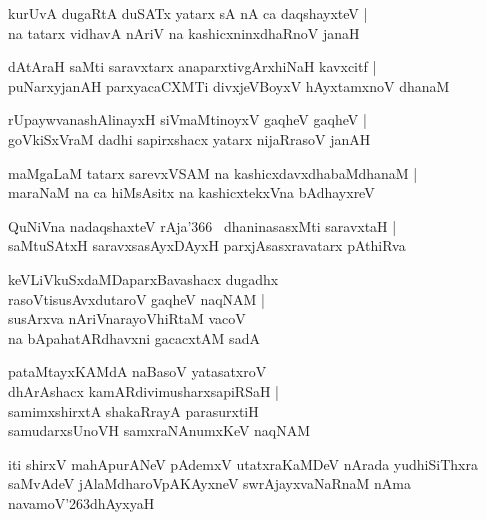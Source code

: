 \documentclass[twoside,12pt,openright]{book}
\def\S{\char'263}
\newcounter{shloka}[chapter]
\begin{document}
\begin{shloka}%
kurUvA dugaRtA duSATx yatarx sA nA ca daqshayxteV |\\
na tatarx vidhavA nAriV na kashicxninxdhaRnoV janaH
\end{shloka}

\begin{shloka}%
dAtAraH saMti saravxtarx anaparxtivgArxhiNaH kavxcitf |\\
puNarxyjanAH parxyacaCXMTi divxjeVBoyxV hAyxtamxnoV dhanaM
\end{shloka}

\begin{shloka}%
rUpaywvanashAlinayxH siVmaMtinoyxV gaqheV gaqheV |\\
goVkiSxVraM dadhi sapirxshacx yatarx nijaRrasoV janAH
\end{shloka}

\begin{shloka}%
maMgaLaM tatarx sarevxVSAM na kashicxdavxdhabaMdhanaM |\\
maraNaM na ca hiMsAsitx na kashicxtekxVna bAdhayxreV 
\end{shloka}

\begin{shloka}%
QuNiVna nadaqshaxteV rAja\char'366 ~dhaninasasxMti saravxtaH |\\
saMtuSAtxH saravxsasAyxDAyxH parxjAsasxravatarx pAthiRva 
\end{shloka}

\begin{shloka}%
keVLiVkuSxdaMDaparxBavashacx dugadhx\\
rasoVtisusAvxdutaroV gaqheV naqNAM |\\
susArxva nAriVnarayoVhiRtaM vacoV \\
na bApahatARdhavxni gacacxtAM sadA 
\end{shloka}

\begin{shloka}%
pataMtayxKAMdA naBasoV yatasatxroV \\
dhArAshacx kamARdivimusharxsapiRSaH |\\
samimxshirxtA shakaRrayA parasurxtiH \\
samudarxsUnoVH samxraNAnumxKeV naqNAM 
\end{shloka}

\begin{center}
iti shirxV mahApurANeV pAdemxV utatxraKaMDeV  nArada yudhiSiThxra saMvAdeV jAlaMdharoVpAKAyxneV swrAjayxvaNaRnaM nAma 
navamoV\S dhAyxyaH 
\end{center}
\end{document}
